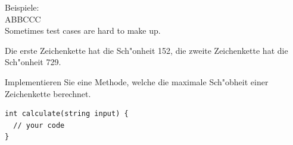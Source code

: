 \documentclass[a4paper,10pt]{article}
\begin{document}
\vspace{3mm}

Beispiele:\\
ABBCCC\\
Sometimes test cases are hard to make up.\\

\vspace{3mm}

Die erste Zeichenkette hat die Sch"onheit 152, die zweite Zeichenkette hat die
Sch"onheit 729.

\vspace{3mm}

Implementieren Sie eine Methode, welche die maximale Sch"obheit einer Zeichenkette
berechnet.

\vspace{3mm}

\begin{lstlisting}
int calculate(string input) {
  // your code
}
\end{lstlisting}
\end{document}
